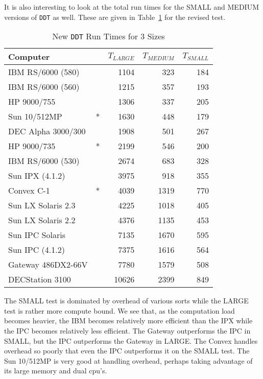 It is also interesting to look at the total run times for the SMALL
and MEDIUM versions of {\tt DDT} as well.  These are given in
Table~\ref{ta:newSmMed} for the revised test.
\begin{table}
\protect\begin{center}
\protect\begin{tabular}{|lc|r|r|r|} \hline
Computer & & $T_{LARGE}$ & $T_{MEDIUM}$ & $T_{SMALL}$ \\ \hline
IBM RS/6000 (580) &   &  1104 &  323 &  184 \\
IBM RS/6000 (560) &   &  1215 &  357 &  193 \\
HP 9000/755       &   &  1306 &  337 &  205 \\
Sun 10/512MP      & * &  1630 &  448 &  179 \\
DEC Alpha 3000/300&   &  1908 &  501 &  267 \\
HP 9000/735       & * &  2199 &  546 &  200 \\
IBM RS/6000 (530) &   &  2674 &  683 &  328 \\
Sun IPX (4.1.2)   &   &  3975 &  918 &  355 \\
Convex C-1        & * &  4039 & 1319 &  770 \\
Sun LX Solaris 2.3&   &  4225 & 1018 &  405 \\
Sun LX Solaris 2.2&   &  4376 & 1135 &  453 \\
Sun IPC Solaris   &   &  7135 & 1670 &  595 \\
Sun IPC (4.1.2)   &   &  7375 & 1616 &  564 \\
Gateway 486DX2-66V&   &  7780 & 1579 &  508 \\
DECStation 3100   &   & 10626 & 2399 &  849 \\
\hline
\end{tabular}
\end{center}
\caption{New {\tt DDT} Run Times for 3 Sizes}
\label{ta:newSmMed}
\end{table}
The SMALL test is dominated by overhead of various sorts while the
LARGE test is rather more compute bound.  We see that, as the
computation load becomes heavier, the IBM becomes relatively more
efficient than the IPX while the IPC becomes relatively less
efficient.  The Gateway outperforms the IPC in SMALL, but the IPC
outperforms the Gateway in LARGE.  The Convex handles overhead so
poorly that even the IPC outperforms it on the SMALL test.  The Sun
10/512MP is very good at handling overhead, perhaps taking advantage
of its large memory and dual cpu's.

